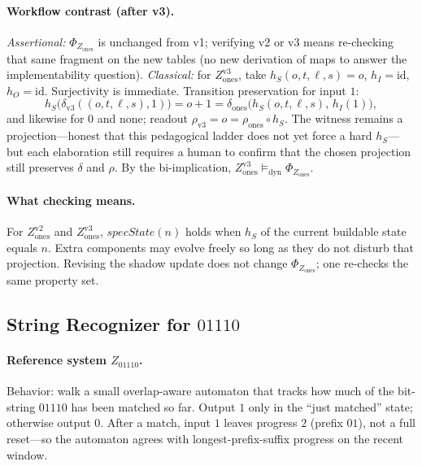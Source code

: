 \paragraph{Workflow contrast (after v3).}
\textit{Assertional:} $\Phi_{Z_{\mathrm{ones}}}$ is unchanged from v1; verifying v2 or v3 means re-checking that same fragment on the new tables (no new derivation of maps to answer the implementability question).
\textit{Classical:} for $Z_{\mathrm{ones}}^{\mathrm{v3}}$, take $h_S(o,t,\ell,s)=o$, $h_I=\mathrm{id}$, $h_O=\mathrm{id}$. Surjectivity is immediate. Transition preservation for input $1$:
\[
  h_S\bigl(\delta_{\mathrm{v3}}((o,t,\ell,s),1)\bigr)
  = o{+}1
  = \delta_{\mathrm{ones}}\bigl(h_S(o,t,\ell,s),\,h_I(1)\bigr),
\]
and likewise for $0$ and $\mathrm{none}$; readout $\rho_{\mathrm{v3}}=o=\rho_{\mathrm{ones}}\circ h_S$. The witness remains a projection---honest that this pedagogical ladder does not yet force a hard $h_S$---but each elaboration still requires a human to confirm that the chosen projection still preserves $\delta$ and $\rho$. By the bi-implication, $Z_{\mathrm{ones}}^{\mathrm{v3}}\models_{\mathrm{dyn}}\Phi_{Z_{\mathrm{ones}}}$.

\paragraph{What checking means.}
For $Z_{\mathrm{ones}}^{\mathrm{v2}}$ and $Z_{\mathrm{ones}}^{\mathrm{v3}}$, $\mathit{specState}(n)$ holds when $h_S$ of the current buildable state equals $n$. Extra components may evolve freely so long as they do not disturb that projection. Revising the shadow update does not change $\Phi_{Z_{\mathrm{ones}}}$; one re-checks the same property set.

\subsection{String Recognizer for \texorpdfstring{$01110$}{01110}}
\label{sec:case-pattern}

\paragraph{Reference system $Z_{01110}$.}
Behavior: walk a small overlap-aware automaton that tracks how much of the bit-string $01110$ has been matched so far. Output $1$ only in the ``just matched'' state; otherwise output $0$. After a match, input $1$ leaves progress $2$ (prefix $01$), not a full reset---so the automaton agrees with longest-prefix-suffix progress on the recent window.

